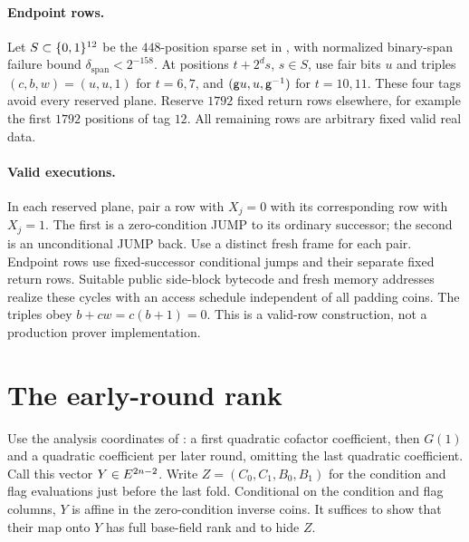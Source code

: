 \documentclass[11pt]{article}
\begin{document}
\paragraph{Endpoint rows.} Let $S\subset\{0,1\}^{12}$ be the $448$-position sparse set in , with normalized binary-span failure bound $\delta_{\mathrm{span}}<2^{-158}$. At positions $t+2^d s$, $s\in S$, use fair bits $u$ and triples $(c,b,w)=(u,u,1)$ for $t=6,7$, and $(\mathsf{g} u,u,\mathsf{g}^{-1})$ for $t=10,11$. These four tags avoid every reserved plane. Reserve $1792$ fixed return rows elsewhere, for example the first $1792$ positions of tag $12$. All remaining rows are arbitrary fixed valid real data.

\paragraph{Valid executions.} In each reserved plane, pair a row with $X_j=0$ with its corresponding row with $X_j=1$. The first is a zero-condition JUMP to its ordinary successor; the second is an unconditional JUMP back. Use a distinct fresh frame for each pair. Endpoint rows use fixed-successor conditional jumps and their separate fixed return rows. Suitable public side-block bytecode and fresh memory addresses realize these cycles with an access schedule independent of all padding coins. The triples obey $b+cw=c(b+1)=0$. This is a valid-row construction, not a production prover implementation.

\section{The early-round rank}

Use the analysis coordinates of : a first quadratic cofactor coefficient, then $G(1)$ and a quadratic coefficient per later round, omitting the last quadratic coefficient. Call this vector $Y\in E^{2n-2}$. Write $Z=(C_0,C_1,B_0,B_1)$ for the condition and flag evaluations just before the last fold. Conditional on the condition and flag columns, $Y$ is affine in the zero-condition inverse coins. It suffices to show that their map onto $Y$ has full base-field rank and to hide $Z$.
\end{document}
